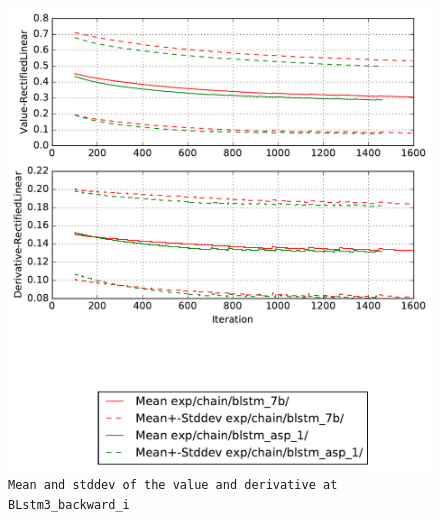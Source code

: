 \documentclass[prl,10pt,twocolumn]{revtex4}
\begin{document}
\newpage
\begin{figure}[h]
  \begin{center}
    \caption{\texttt{Mean and stddev of the value and derivative at BLstm3\_backward\_i}}
    \includegraphics[width=\textwidth]{exp/chain/blstm_7b/report/nonlinstats_BLstm3_backward_i.pdf}
  \end{center}
\end{figure}
\clearpage
\end{document}
